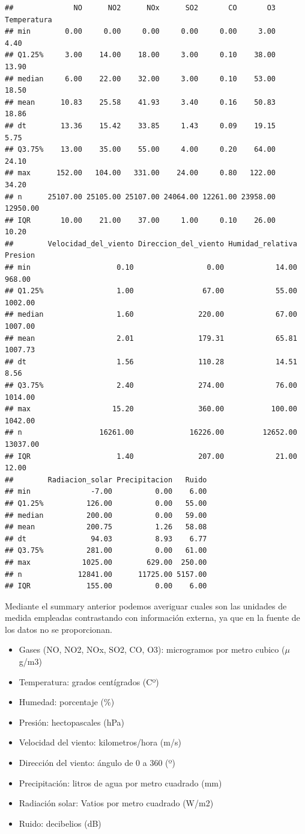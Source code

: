 \documentclass[notspecified,article,submit,moreauthors,pdftex]{Definitions/mdpi}
\providecommand{\tightlist}{%
  \setlength{\itemsep}{0pt}\setlength{\parskip}{0pt}}
\begin{document}
\begin{verbatim}
##              NO      NO2      NOx      SO2       CO       O3 Temperatura
## min        0.00     0.00     0.00     0.00     0.00     3.00        4.40
## Q1.25%     3.00    14.00    18.00     3.00     0.10    38.00       13.90
## median     6.00    22.00    32.00     3.00     0.10    53.00       18.50
## mean      10.83    25.58    41.93     3.40     0.16    50.83       18.86
## dt        13.36    15.42    33.85     1.43     0.09    19.15        5.75
## Q3.75%    13.00    35.00    55.00     4.00     0.20    64.00       24.10
## max      152.00   104.00   331.00    24.00     0.80   122.00       34.20
## n      25107.00 25105.00 25107.00 24064.00 12261.00 23958.00    12950.00
## IQR       10.00    21.00    37.00     1.00     0.10    26.00       10.20
##        Velocidad_del_viento Direccion_del_viento Humidad_relativa  Presion
## min                    0.10                 0.00            14.00   968.00
## Q1.25%                 1.00                67.00            55.00  1002.00
## median                 1.60               220.00            67.00  1007.00
## mean                   2.01               179.31            65.81  1007.73
## dt                     1.56               110.28            14.51     8.56
## Q3.75%                 2.40               274.00            76.00  1014.00
## max                   15.20               360.00           100.00  1042.00
## n                  16261.00             16226.00         12652.00 13037.00
## IQR                    1.40               207.00            21.00    12.00
##        Radiacion_solar Precipitacion   Ruido
## min              -7.00          0.00    6.00
## Q1.25%          126.00          0.00   55.00
## median          200.00          0.00   59.00
## mean            200.75          1.26   58.08
## dt               94.03          8.93    6.77
## Q3.75%          281.00          0.00   61.00
## max            1025.00        629.00  250.00
## n             12841.00      11725.00 5157.00
## IQR             155.00          0.00    6.00
\end{verbatim}

Mediante el summary anterior podemos averiguar cuales son las unidades
de medida empleadas contrastando con información externa, ya que en la
fuente de los datos no se proporcionan.

\begin{itemize}
\tightlist
\item
  Gases (NO, NO2, NOx, SO2, CO, O3): microgramos por metro cubico
  (\(\mu\)g/m3)
\item
  Temperatura: grados centígrados (Cº)
\item
  Humedad: porcentaje (\%)
\item
  Presión: hectopascales (hPa)
\item
  Velocidad del viento: kilometros/hora (m/s)
\item
  Dirección del viento: ángulo de 0 a 360 (º)
\item
  Precipitación: litros de agua por metro cuadrado (mm)
\item
  Radiación solar: Vatios por metro cuadrado (W/m2)
\item
  Ruido: decibelios (dB)
\end{itemize}
\end{document}
